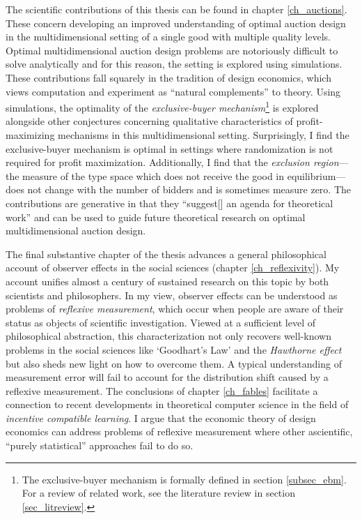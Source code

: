 The scientific contributions of this thesis can be found in chapter \ref{ch_auctions}. These concern developing an improved understanding of optimal auction design in the multidimensional setting of a single good with multiple quality levels. Optimal multidimensional auction design problems are notoriously difficult to solve analytically and for this reason, the setting is explored using simulations. These contributions fall squarely in the tradition of design economics, which views computation and experiment as ``natural complements'' \autocite[1342]{roth2002} to theory. Using simulations, the optimality of the \textit{exclusive-buyer mechanism}\footnote{The exclusive-buyer mechanism is formally defined in section \ref{subsec_ebm}. For a review of related work, see the literature review in section \ref{sec_litreview}.} is explored alongside other conjectures concerning qualitative characteristics of profit-maximizing mechanisms in this multidimensional setting. Surprisingly, I find the exclusive-buyer mechanism is optimal in settings where randomization is not required for profit maximization. Additionally, I find that the \textit{exclusion region}---the measure of the type space which does not receive the good in equilibrium---does not change with the number of bidders and is sometimes measure zero. The contributions are generative in that they ``suggest[] an agenda for theoretical work'' \autocite[1363]{roth2002} and can be used to guide future theoretical research on optimal multidimensional auction design.

The final substantive chapter of the thesis advances a general philosophical account of observer effects in the social sciences (chapter \ref{ch_reflexivity}). My account unifies almost a century of sustained research on this topic by both scientists and philosophers. In my view, observer effects can be understood as problems of \textit{reflexive measurement}, which occur when people are aware of their status as objects of scientific investigation. Viewed at a sufficient level of philosophical abstraction, this characterization not only recovers well-known problems in the social sciences like `Goodhart's Law' and the \textit{Hawthorne effect} but also sheds new light on how to overcome them. A typical understanding of measurement error will fail to account for the distribution shift caused by a reflexive measurement. The conclusions of chapter \ref{ch_fables} facilitate a connection to recent developments in theoretical computer science in the field of \textit{incentive compatible learning}. I argue that the economic theory of design economics can address problems of reflexive measurement where other ascientific, ``purely statistical'' \autocite[319]{marget1929} approaches fail to do so. 

